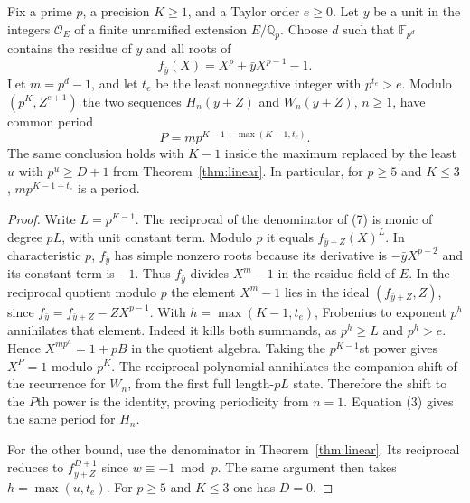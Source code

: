 \documentclass[11pt]{article}
\begin{document}
\begin{theorem}\label{thm:jet-period}
Fix a prime $p$, a precision $K\ge1$, and a Taylor order $e\ge0$.
Let $y$ be a unit in the integers $\mathcal O_E$ of a finite
unramified extension $E/\mathbb Q_p$. Choose $d$ such that
$\mathbb F_{p^d}$ contains the residue of $y$ and all roots of
\[
 f_{\bar y}(X)=X^p+\bar y X^{p-1}-1 .
\]
Let $m=p^d-1$, and let $t_e$ be the least nonnegative integer
with $p^{t_e}>e$. Modulo $(p^K,Z^{e+1})$ the two sequences
$H_n(y+Z)$ and $W_n(y+Z)$, $n\ge1$, have common period
\[
 P=m p^{K-1+\max(K-1,t_e)} .
 \tag{10}
\]
The same conclusion holds with $K-1$ inside the maximum
replaced by the least $u$ with $p^u\ge D+1$ from
Theorem~\ref{thm:linear}. In particular, for $p\ge5$ and
$K\le3$, $m p^{K-1+t_e}$ is a period.
\end{theorem}
\begin{proof}
Write $L=p^{K-1}$.
The reciprocal of the denominator of (7) is monic of degree
$pL$, with unit constant term. Modulo $p$ it equals
$f_{\bar y+Z}(X)^L$. In characteristic $p$,
$f_{\bar y}$ has simple nonzero roots because its derivative is
$-\bar y X^{p-2}$ and its constant term is $-1$.
Thus $f_{\bar y}$ divides $X^m-1$ in the residue field
of $E$. In the reciprocal quotient modulo $p$ the element
$X^m-1$ lies in the ideal $(f_{\bar y+Z},Z)$, since
$f_{\bar y}=f_{\bar y+Z}-ZX^{p-1}$.
With $h=\max(K-1,t_e)$, Frobenius to exponent $p^h$
annihilates that element. Indeed it kills both summands, as
$p^h\ge L$ and $p^h>e$. Hence $X^{mp^h}=1+pB$ in the quotient algebra.
Taking the $p^{K-1}$st power gives $X^P=1$ modulo $p^K$.
The reciprocal polynomial annihilates the companion shift of
the recurrence for $W_n$, from the first full length-$pL$ state.
Therefore the shift to the $P$th power is the identity, proving
periodicity from $n=1$. Equation (3) gives the same period for $H_n$.

For the other bound, use the denominator in Theorem~\ref{thm:linear}.
Its reciprocal reduces to $f_{\bar y+Z}^{D+1}$ since $w\equiv-1\bmod p$.
The same argument then takes $h=\max(u,t_e)$.
For $p\ge5$ and $K\le3$ one has $D=0$.
\end{proof}
\end{document}
